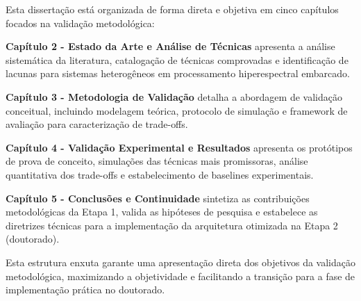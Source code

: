 Esta dissertação está organizada de forma direta e objetiva em cinco capítulos focados na validação metodológica:

\textbf{Capítulo 2 - Estado da Arte e Análise de Técnicas} apresenta a análise sistemática da literatura, catalogação de técnicas comprovadas e identificação de lacunas para sistemas heterogêneos em processamento hiperespectral embarcado.

\textbf{Capítulo 3 - Metodologia de Validação} detalha a abordagem de validação conceitual, incluindo modelagem teórica, protocolo de simulação e framework de avaliação para caracterização de trade-offs.

\textbf{Capítulo 4 - Validação Experimental e Resultados} apresenta os protótipos de prova de conceito, simulações das técnicas mais promissoras, análise quantitativa dos trade-offs e estabelecimento de baselines experimentais.

\textbf{Capítulo 5 - Conclusões e Continuidade} sintetiza as contribuições metodológicas da Etapa 1, valida as hipóteses de pesquisa e estabelece as diretrizes técnicas para a implementação da arquitetura otimizada na Etapa 2 (doutorado).

Esta estrutura enxuta garante uma apresentação direta dos objetivos da validação metodológica, maximizando a objetividade e facilitando a transição para a fase de implementação prática no doutorado.